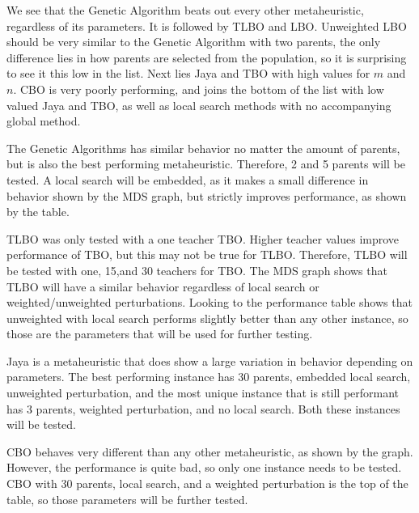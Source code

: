 \documentclass[11pt, letterpaper, onecolumn]{article}
\begin{document}
\begin{table}[htbp]
\end{table}

We see that the Genetic Algorithm beats out every other metaheuristic, regardless of its parameters. It is followed by TLBO and LBO. Unweighted LBO should be very similar to the Genetic Algorithm with two parents, the only difference lies in how parents are selected from the population, so it is surprising to see it this low in the list. Next lies Jaya and TBO with high values for $m$ and $n$. CBO is very poorly performing, and joins the bottom of the list with low valued Jaya and TBO, as well as local search methods with no accompanying global method. 

The Genetic Algorithms has similar behavior no matter the amount of parents, but is also the best performing metaheuristic. Therefore, 2 and 5 parents will be tested. A local search will be embedded, as it makes a small difference in behavior shown by the MDS graph, but strictly improves performance, as shown by the table. 

TLBO was only tested with a one teacher TBO. Higher teacher values improve performance of TBO, but this may not be true for TLBO. Therefore, TLBO will be tested with one, 15,and 30 teachers for TBO. The MDS graph shows that TLBO will have a similar behavior regardless of local search or weighted/unweighted perturbations. Looking to the performance table shows that unweighted with local search performs slightly better than any other instance, so those are the parameters that will be used for further testing. 

Jaya is a metaheuristic that does show a large variation in behavior depending on parameters. The best performing instance has 30 parents, embedded local search, unweighted perturbation, and the most unique instance that is still performant has 3 parents, weighted perturbation, and no local search. Both these instances will be tested. 

CBO behaves very different than any other metaheuristic, as shown by the graph. However, the performance is quite bad, so only one instance needs to be tested. CBO with 30 parents, local search, and a weighted perturbation is the top of the table, so those parameters will be further tested. 
\end{document}
